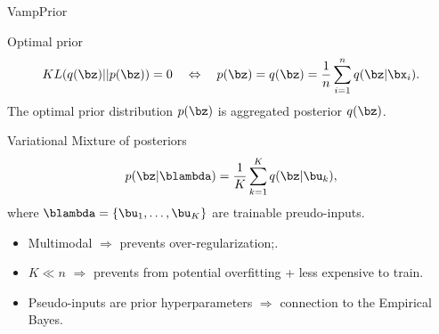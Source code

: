 \begin{frame}{VampPrior}
	\begin{block}{Optimal prior}
		\vspace{-0.3cm}
		\[
		KL(q(\bz) || p(\bz)) = 0 \quad \Leftrightarrow \quad p (\bz) = q(\bz) = \frac{1}{n} \sum_{i=1}^n q(\bz | \bx_i).
		\]
		The optimal prior distribution $p(\bz)$ is aggregated posterior $q(\bz)$.
	\end{block}
	\begin{block}{Variational Mixture of posteriors}
		\vspace{-0.2cm}
		\[
		p(\bz | \blambda) = \frac{1}{K} \sum_{k=1}^K q(\bz | \bu_k),
		\]
		where $\blambda = \{\bu_1, \dots, \bu_K\}$ are trainable preudo-inputs.
	\end{block}
	\begin{itemize}
		\item Multimodal $\Rightarrow$ prevents over-regularization;.
		\item $K \ll n$ $\Rightarrow$ prevents from potential overfitting + less expensive to train.
		\item Pseudo-inputs are prior hyperparameters $\Rightarrow$ connection to the Empirical Bayes.
	\end{itemize}
\end{frame}
